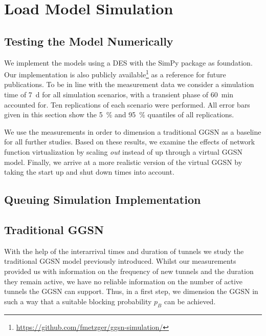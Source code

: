 \section{Load Model Simulation} 
\label{c4:simulation}

\subsection{Testing the Model Numerically}
\label{c4:sec:model-numerical}

We implement the models using a \gls{DES} with the SimPy \cite{simpy} package as foundation. Our implementation is also publicly available\footnote{\url{https://github.com/fmetzger/ggsn-simulation/}} as a reference for future publications. To be in line with the measurement data we consider a simulation time of \SI{7}{\day} for all simulation scenarios, with a transient phase of \SI{60}{\minute} accounted for. Ten replications of each scenario were performed. All error bars given in this section show the \SI{5}{\percent} and \SI{95}{\percent} quantiles of all replications.


We use the measurements in order to dimension a traditional \gls{GGSN} as a baseline for all further studies. Based on these results, we examine the effects of network function virtualization by scaling \emph{out} instead of up through a virtual \gls{GGSN} model. Finally, we arrive at a more realistic version of the virtual \gls{GGSN} by taking the start up and shut down times into account.





\subsection{Queuing Simulation Implementation}


\subsection{Traditional GGSN}
\label{c4:sec:eval_traditional_ggsn}

With the help of the interarrival times and duration of tunnels we study the traditional \gls{GGSN} model previously introduced. Whilst our measurements provided us with information on the frequency of new tunnels and the duration they remain active, we have no reliable information on the number of active tunnels the \gls{GGSN} can support. Thus, in a first step, we dimension the \gls{GGSN} in such a way that a suitable blocking probability $p_B$ can be achieved.

